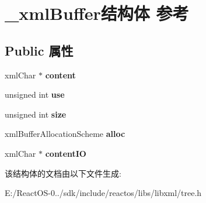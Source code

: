 \hypertarget{struct__xml_buffer}{}\section{\+\_\+xml\+Buffer结构体 参考}
\label{struct__xml_buffer}
\subsection*{Public 属性}
\begin{DoxyCompactItemize}
\item 
\mbox{\label{struct__xml_buffer_aec9312296378e1d503fce977e45e40bb}} 
xml\+Char $\ast$ {\bfseries content}
\item 
\mbox{\label{struct__xml_buffer_aaf67415a2fbcd5030c7d3f828b735ad6}} 
unsigned int {\bfseries use}
\item 
\mbox{\label{struct__xml_buffer_a9729e805b7736692f496eefac6103210}} 
unsigned int {\bfseries size}
\item 
\mbox{\label{struct__xml_buffer_acac8aee322443ed7a9d0854ee5a87b02}} 
xml\+Buffer\+Allocation\+Scheme {\bfseries alloc}
\item 
\mbox{\label{struct__xml_buffer_add445d2ccadd92de7a65b26c82c43943}} 
xml\+Char $\ast$ {\bfseries content\+IO}
\end{DoxyCompactItemize}


该结构体的文档由以下文件生成\+:\begin{DoxyCompactItemize}
\item 
E\+:/\+React\+O\+S-\/0../sdk/include/reactos/libs/libxml/tree.\+h\end{DoxyCompactItemize}
